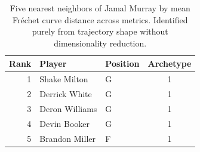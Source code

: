 \begin{table}[htbp]
  \centering\small
  \begin{tabular}{rllc}
    \toprule
    Rank & Player & Position & Archetype \\
    \midrule
    1 & Shake Milton & G & 1 \\
    2 & Derrick White & G & 1 \\
    3 & Deron Williams & G & 1 \\
    4 & Devin Booker & G & 1 \\
    5 & Brandon Miller & F & 1 \\
    \bottomrule
  \end{tabular}
  \caption{Five nearest neighbors of Jamal Murray by mean Fr\'{e}chet curve distance across metrics. Identified purely from trajectory shape without dimensionality reduction.}
  \label{tab:Jamal_Murray_frechet_curve_neighbors}
\end{table}

